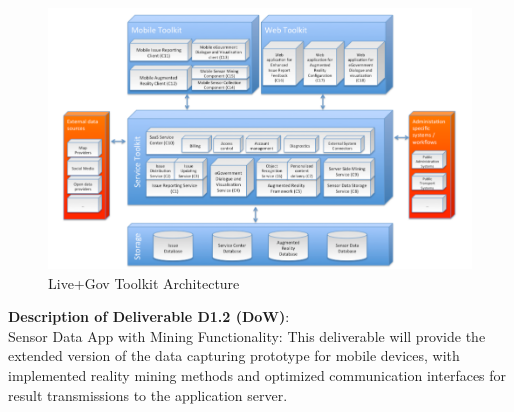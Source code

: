 \documentclass[external]{20120615_deliverable_template_ukob}
\theoremstyle{definition}
\begin{document}
\begin{figure}
  \centering
  \includegraphics[width = 0.8 \textwidth]{img/intro/architecture.png}
  \caption{Live+Gov Toolkit Architecture}
\end{figure}

% 

{\bf Description of Deliverable D1.2 (DoW)}: \\
Sensor Data App with Mining Functionality: This deliverable will provide the
extended version of the data capturing prototype for mobile devices, with
implemented reality mining methods and optimized communication interfaces for
result transmissions to the application server.
\end{document}
